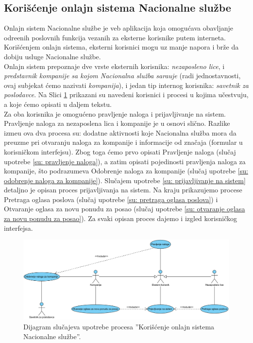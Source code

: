 \subsection{Kori\v s\' cenje onlajn sistema Nacionalne slu\v zbe}

Onlajn sistem Nacionalne slu\v zbe je veb aplikacija koja omogu\' cava obavljanje odre\dj enih poslovnih funkcija vezanih za eksterne korisnike putem interneta. Kori\v s\' cenjem onlajn sistema, eksterni korisnici mogu uz manje napora i br\v ze da dobiju usluge Nacionalne slu\v zbe.\\

Onlajn sistem prepoznaje dve vrste eksternih korisnika: \textit{nezaposleno lice}, i \textit{predstavnik kompanije sa kojom Nacionalna slu\v zba sara\dj uje} (radi jednostavnosti, ovaj subjekat \'cemo nazivati \textit{kompanija}), i jedan tip internog korisnika: \textit{savetnik za poslodavce}. Na Slici \ref{dsu: koriscenje onlajn sistema nacionalne sluzbe} prikazani su navedeni korisnici i procesi u kojima u\v cestvuju, a koje \'cemo opisati u daljem tekstu.\\

Za oba korisnika je omogu\' ceno pravljenje naloga i prijavljivanje na sistem. Pravljenje naloga za nezaposlena lica i kompanije je u osnovi sli\v cno. Razlike izme\dj u ova dva procesa su: dodatne aktivnosti koje Nacionalna slu\v zba mora da preuzme pri otvaranju naloga za kompanije i informacije od zna\v caja (formular u korisni\v ckom interfejsu). Zbog toga \' cemo prvo opisati Pravljenje naloga (slu\v caj upotrebe \ref{su: pravljenje naloga}), a zatim opisati pojedinosti pravljenja naloga za kompanije, \v sto podrazumeva Odobrenje naloga za kompanije (slu\v caj upotrebe \ref{su: odobrenje naloga za kompanije}). Slu\v cajem upotrebe \ref{su: prijavljivanje na sistem} detaljno je opisan proces prijavljivanja na sistem. Na kraju prikazujemo procese Pretraga oglasa poslova (slu\v caj upotrebe \ref{su: pretraga oglasa poslova}) i Otvaranje oglasa za novu ponudu za posao (slu\v caj upotrebe \ref{su: otvaranje oglasa za novu ponudu za posao}). Za svaki opisan proces dajemo i izgled korisni\v ckog interfejsa.

\begin{figure}[H]
	\centering
	\includegraphics[width=\textwidth]{dijagrami/dijagrami-slucajeva-upotrebe/onlajn-sistem.png}
	\caption{Dijagram slu\v cajeva upotrebe procesa ''Kori\v s\' cenje onlajn sistema Nacionalne slu\v zbe''.}
	\label{dsu: koriscenje onlajn sistema nacionalne sluzbe}
\end{figure}

